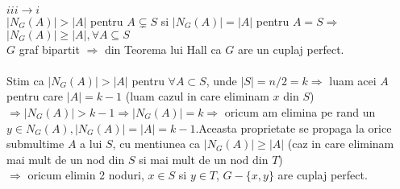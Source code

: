 \documentclass{article}
\begin{document}
$iii \rightarrow i$\\
$|N_G(A)|>|A|$ pentru $A \subsetneq S$ si $|N_G(A)|=|A|$ pentru $A=S\Rightarrow$ $|N_G(A)|\geq |A|, \forall A \subseteq S$ \\
$G$ graf bipartit $\Rightarrow$ din Teorema lui Hall ca $G$ are un cuplaj perfect.\\
\bigskip\\
Stim ca $|N_G(A)|>|A|$ pentru $\forall A \subset S$, unde $|S|=n/2=k \Rightarrow$ luam acei $A$ pentru care $|A|=k-1$ (luam cazul in care eliminam $x$ din $S$) $\Rightarrow |N_G(A)|>k-1 \Rightarrow |N_G(A)|=k \Rightarrow$ oricum am elimina pe rand un $y \in N_G(A), |N_G(A)|=|A|=k-1$.Aceasta proprietate se propaga la orice submultime $A$ a lui $S$, cu mentiunea ca $|N_G(A)| \geq |A|$ (caz in care eliminam mai mult de un nod din $S$ si mai mult de un nod din $T$)\\
$\Rightarrow$ oricum elimin 2 noduri, $x\in S$ si $y\in T$, $G-\{x,y\}$ are cuplaj perfect.\\
\newpage
\end{document}
